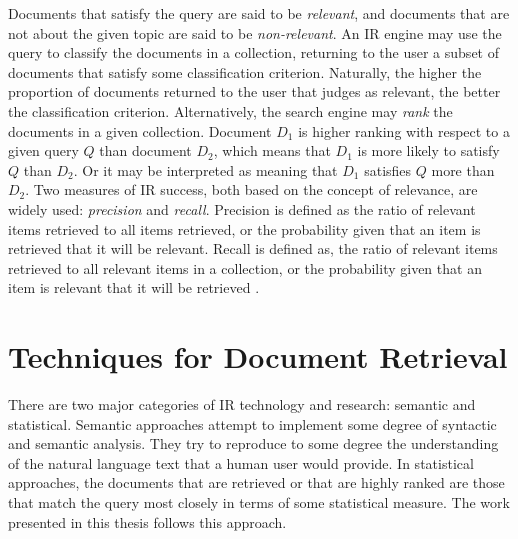 Documents that satisfy the query are said to be \textit{relevant}, and documents that are not about the given topic are said to be \textit{non-relevant}. An IR engine may use the query to classify the documents in a collection, returning to the user a subset of documents that satisfy some classification criterion. Naturally, the higher the proportion of documents returned to the user that judges as relevant, the better the classification criterion. Alternatively, the search engine may \textit{rank} the documents in a given collection. Document $D_1$ is higher ranking with respect to a given query $Q$ than document $D_2$, which means that $D_1$ is more likely to satisfy $Q$ than $D_2$. Or it may be interpreted as meaning that $D_1$ satisfies $Q$ more than $D_2$. Two measures of IR success, both based on the concept of relevance, are widely used: \textit{precision} and \textit{recall}. Precision is defined as the ratio of relevant items retrieved to all items retrieved, or the probability given that an item is retrieved that it will be relevant. Recall is defined as, the ratio of relevant items retrieved to all relevant items in a collection, or the probability given that an item is relevant that it will be retrieved \citep{saracevic1995}.

\section{Techniques for Document Retrieval}\label{sec:related-work}

There are two major categories of IR technology and research: semantic and statistical. Semantic approaches attempt to implement some degree of syntactic and semantic analysis. They try to reproduce to some degree the understanding of the natural language text that a human user would provide. In statistical approaches, the documents that are retrieved or that are highly ranked are those that match the query most closely in terms of some statistical measure. The work presented in this thesis follows this approach. 

